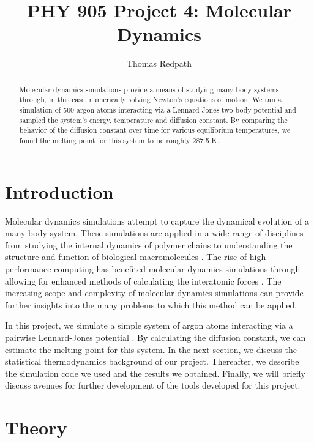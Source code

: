 \documentclass[10pt,showpacs,preprintnumbers,footinbib,amsmath,amssymb,aps,prl,twocolumn,groupedaddress,superscriptaddress,showkeys]{revtex4-1}
\begin{document}
\title{PHY 905 Project 4: Molecular Dynamics}
\author{Thomas Redpath}
\begin{abstract}
Molecular dynamics simulations provide a means of studying many-body
systems through, in this case, numerically solving Newton's equations
of motion. We ran a
simulation of 500 argon atoms interacting via a Lennard-Jones
two-body potential and sampled the system's energy, temperature
and diffusion constant. By comparing the behavior of the diffusion
constant over time for various equilibrium temperatures, we found
the melting point for this system to be roughly 287.5 K.

\end{abstract}
\maketitle

\section{Introduction}

Molecular dynamics simulations attempt to capture the dynamical evolution
of a many body system. These simulations are applied in a wide range of
disciplines from studying the internal dynamics of polymer chains
\citep{Binder2004} to understanding the structure and function
of biological macromolecules \citep{Karplus}. The rise of high-performance
computing has benefited molecular dynamics simulations through allowing
for enhanced methods of calculating the interatomic forces \citep{Kuhne2012}.
The increasing scope and complexity of molecular
dynamics simulations can provide further insights into the
many problems to which this method can be applied.

In this project, we
simulate a simple system of argon atoms interacting via a pairwise
Lennard-Jones potential \citep{Rahman1964,Verlet1967}.
By calculating the diffusion constant, we can
estimate the melting point for this system. In the next section, we
discuss the statistical thermodynamics background of our project.
Thereafter, we describe the simulation code we used and the results we
obtained. Finally, we will briefly discuss avenues for further development
of the tools developed for this project.



\section{Theory}
\end{document}
